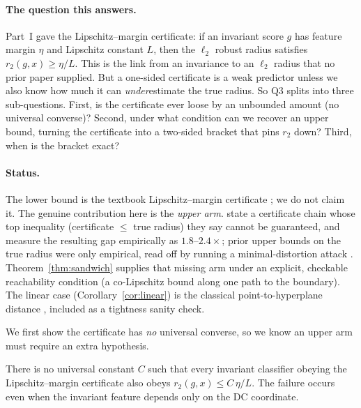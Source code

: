 \paragraph{The question this answers.}
Part~I gave the Lipschitz--margin certificate: if an invariant score $g$ has feature margin $\eta$
and Lipschitz constant $L$, then the $\ell_2$ robust radius satisfies $r_2(g,x) \ge \eta/L$. This is
the link from an invariance to an $\ell_2$ radius that no prior paper supplied. But a one-sided
certificate is a weak predictor unless we also know how much it can \emph{under}estimate the true
radius. So Q3 splits into three sub-questions. First, is the certificate ever loose by an unbounded
amount (no universal converse)? Second, under what condition can we recover an upper bound, turning
the certificate into a two-sided bracket that pins $r_2$ down? Third, when is the bracket exact?

\paragraph{Status.}
The lower bound is the textbook Lipschitz--margin certificate \citep{hein2017formal,tsuzuku2018lipschitz};
we do not claim it. The genuine contribution here is the \emph{upper arm}. \citet{tsuzuku2018lipschitz}
state a certificate chain whose top inequality (certificate $\le$ true radius) they say cannot be
guaranteed, and measure the resulting gap empirically as $1.8$--$2.4\times$; prior upper bounds on the
true radius were only empirical, read off by running a minimal-distortion attack
\citep{croce2020reliable}. Theorem~\ref{thm:sandwich} supplies that missing arm under an explicit,
checkable reachability condition (a co-Lipschitz bound along one path to the boundary). The linear
case (Corollary~\ref{cor:linear}) is the classical point-to-hyperplane distance
\citep{hein2017formal,cortes1995}, included as a tightness sanity check.

We first show the certificate has \emph{no} universal converse, so we know an upper arm must require
an extra hypothesis.

\begin{proposition}
\label{prop:noconverse}
There is no universal constant $C$ such that every invariant classifier obeying the
Lipschitz--margin certificate also obeys $r_2(g,x) \le C\,\eta/L$. The failure occurs even when the
invariant feature depends only on the DC coordinate.
\end{proposition}

